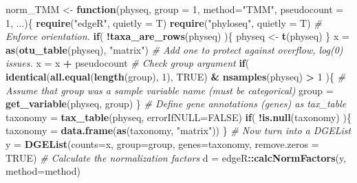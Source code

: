 \documentclass[
]{book}
\newenvironment{Shaded}{\begin{snugshade}}{\end{snugshade}}
\newcommand{\CommentTok}[1]{\textcolor[rgb]{0.56,0.35,0.01}{\textit{#1}}}
\newcommand{\ControlFlowTok}[1]{\textcolor[rgb]{0.13,0.29,0.53}{\textbf{#1}}}
\newcommand{\DataTypeTok}[1]{\textcolor[rgb]{0.13,0.29,0.53}{#1}}
\newcommand{\DecValTok}[1]{\textcolor[rgb]{0.00,0.00,0.81}{#1}}
\newcommand{\KeywordTok}[1]{\textcolor[rgb]{0.13,0.29,0.53}{\textbf{#1}}}
\newcommand{\NormalTok}[1]{#1}
\newcommand{\OperatorTok}[1]{\textcolor[rgb]{0.81,0.36,0.00}{\textbf{#1}}}
\newcommand{\OtherTok}[1]{\textcolor[rgb]{0.56,0.35,0.01}{#1}}
\newcommand{\StringTok}[1]{\textcolor[rgb]{0.31,0.60,0.02}{#1}}
\begin{document}
\begin{Shaded}
\begin{Highlighting}[]
\NormalTok{norm\_TMM \textless{}{-}}\StringTok{ }\ControlFlowTok{function}\NormalTok{(physeq, }\DataTypeTok{group =} \DecValTok{1}\NormalTok{, }\DataTypeTok{method=}\StringTok{"TMM"}\NormalTok{, }\DataTypeTok{pseudocount =} \DecValTok{1}\NormalTok{, ...)\{}
    \KeywordTok{require}\NormalTok{(}\StringTok{"edgeR"}\NormalTok{, }\DataTypeTok{quietly =}\NormalTok{ T)}
    \KeywordTok{require}\NormalTok{(}\StringTok{"phyloseq"}\NormalTok{, }\DataTypeTok{quietly =}\NormalTok{ T)}
    \CommentTok{\# Enforce orientation.}
    \ControlFlowTok{if}\NormalTok{( }\OperatorTok{!}\KeywordTok{taxa\_are\_rows}\NormalTok{(physeq) )\{ physeq \textless{}{-}}\StringTok{ }\KeywordTok{t}\NormalTok{(physeq) \}}
\NormalTok{    x =}\StringTok{ }\KeywordTok{as}\NormalTok{(}\KeywordTok{otu\_table}\NormalTok{(physeq), }\StringTok{"matrix"}\NormalTok{)}
    \CommentTok{\# Add one to protect against overflow, log(0) issues.}
\NormalTok{    x =}\StringTok{ }\NormalTok{x }\OperatorTok{+}\StringTok{ }\NormalTok{pseudocount}
    \CommentTok{\# Check \textasciigrave{}group\textasciigrave{} argument}
    \ControlFlowTok{if}\NormalTok{( }\KeywordTok{identical}\NormalTok{(}\KeywordTok{all.equal}\NormalTok{(}\KeywordTok{length}\NormalTok{(group), }\DecValTok{1}\NormalTok{), }\OtherTok{TRUE}\NormalTok{) }\OperatorTok{\&}\StringTok{ }\KeywordTok{nsamples}\NormalTok{(physeq) }\OperatorTok{\textgreater{}}\StringTok{ }\DecValTok{1}\NormalTok{ )\{}
        \CommentTok{\# Assume that group was a sample variable name (must be categorical)}
\NormalTok{        group =}\StringTok{ }\KeywordTok{get\_variable}\NormalTok{(physeq, group)}
\NormalTok{    \}}
    \CommentTok{\# Define gene annotations (\textasciigrave{}genes\textasciigrave{}) as tax\_table}
\NormalTok{    taxonomy =}\StringTok{ }\KeywordTok{tax\_table}\NormalTok{(physeq, }\DataTypeTok{errorIfNULL=}\OtherTok{FALSE}\NormalTok{)}
    \ControlFlowTok{if}\NormalTok{( }\OperatorTok{!}\KeywordTok{is.null}\NormalTok{(taxonomy) )\{}
\NormalTok{        taxonomy =}\StringTok{ }\KeywordTok{data.frame}\NormalTok{(}\KeywordTok{as}\NormalTok{(taxonomy, }\StringTok{"matrix"}\NormalTok{))}
\NormalTok{    \} }
    \CommentTok{\# Now turn into a DGEList}
\NormalTok{    y =}\StringTok{ }\KeywordTok{DGEList}\NormalTok{(}\DataTypeTok{counts=}\NormalTok{x, }\DataTypeTok{group=}\NormalTok{group, }\DataTypeTok{genes=}\NormalTok{taxonomy, }\DataTypeTok{remove.zeros =} \OtherTok{TRUE}\NormalTok{)}
    \CommentTok{\# Calculate the normalization factors}
\NormalTok{    d =}\StringTok{ }\NormalTok{edgeR}\OperatorTok{::}\KeywordTok{calcNormFactors}\NormalTok{(y, }\DataTypeTok{method=}\NormalTok{method)}

\end{Highlighting}
\end{Shaded}
\end{document}
